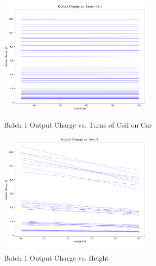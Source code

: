 \begin{figure}
    \begin{center}
    \includegraphics[width=3in]{fig17.png}
    \end{center}
    \renewcommand{\baselinestretch}{1}
    \small\normalsize
    \begin{quote}
    \caption[Batch 1 Output Charge vs. Turns of Coil on Car	]{Batch 1 Output Charge vs. Turns of Coil on Car} \label{fig: f17}
    \end{quote}
\end{figure}

\begin{figure}
    \begin{center}
    \includegraphics[width=3in]{fig18.png}
    \end{center}
    \renewcommand{\baselinestretch}{1}
    \small\normalsize
    \begin{quote}
    \caption[Batch 1 Output Charge vs. Height]{Batch 1 Output Charge vs. Height } \label{fig: f18}
    \end{quote}
\end{figure}

